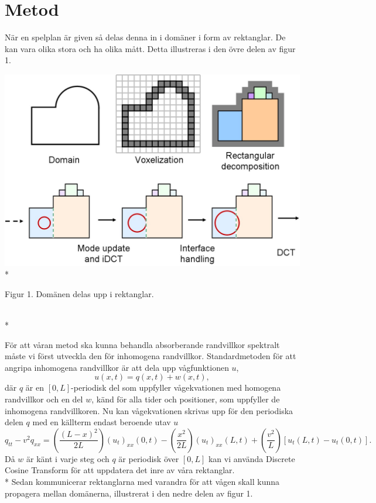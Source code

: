 \section*{Metod}
När en spelplan är given så delas denna in i domäner i form av rektanglar. De kan vara olika stora och ha olika mått. Detta illustreras i den övre delen av figur 1. 
\newline
\newline
\begin{minipage}{\linewidth}
\begin{center}
    \includegraphics[width = 0.5\linewidth]{domain.jpg}\\*
    \caption{Figur 1. Domänen delas upp i rektanglar\cite{rect_decomp}.}\\*
    \end{center}
\end{minipage}
\newline
\newline
För att våran metod ska kunna behandla absorberande randvillkor spektralt måste vi först utveckla den för inhomogena randvillkor. Standardmetoden för att angripa inhomogena randvillkor är att dela upp vågfunktionen $u$,
\begin{equation}
u(x,t) = q(x,t) + w(x,t),
\end{equation}
där $q$ är en $[0,L]$-periodisk del som uppfyller vågekvationen med homogena randvillkor och en del $w$, känd för alla tider och positioner, som uppfyller de inhomogena randvillkoren. Nu kan vågekvationen skrivas upp för den periodiska delen $q$ med en källterm endast beroende utav $u$
\begin{equation} \label{eq:abcstep}
q_{tt} - v^{2}q_{xx} = \left(\frac{(L-x)^{2}}{2L}\right)(u_{t})_{xx}(0,t) - \left(\frac{x^{2}}{2L}\right)(u_{t})_{xx}(L,t) + \left(\frac{v^{2}}{L}\right)[u_{t}(L,t) - u_{t}(0,t)].
\end{equation}
Då $w$ är känt i varje steg och $q$ är periodisk över $[0,L]$ kan vi använda Discrete Cosine Transform för att uppdatera det inre av våra rektanglar.\\*
Sedan kommunicerar rektanglarna med varandra för att vågen skall kunna propagera mellan domänerna, illustrerat i den nedre delen av figur 1.

